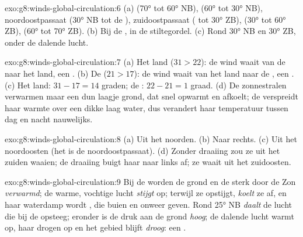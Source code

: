 \begin{solution}{exo:g8:winds-global-circulation:6}
(a)  (\ang{70} tot \ang{60} NB),  (\ang{60}
tot \ang{30} NB), noordoostpassaat (\ang{30} NB tot de ),
zuidoostpassaat ( tot \ang{30} ZB),  (\ang{30} tot
\ang{60} ZB),  (\ang{60} tot \ang{70} ZB). (b) Bij de
, in de stiltegordel. (c) Rond \ang{30} NB en \ang{30} ZB, onder de
dalende lucht.
\end{solution}

\begin{solution}{exo:g8:winds-global-circulation:7}
(a) Het land ($31 > 22$): de wind waait van de  naar het land, een
. (b) De  ($21 > 17$): de wind waait van het land naar de
, een . (c) Het land: $31 - 17 = 14$ graden; de : $22 -
21 = 1$ graad. (d) De zonnestralen verwarmen maar een dun laagje grond, dat
snel opwarmt en afkoelt; de  verspreidt haar warmte over een dikke laag
water, dus verandert haar temperatuur tussen dag en nacht nauwelijks.
\end{solution}

\begin{solution}{exo:g8:winds-global-circulation:8}
(a) Uit het noorden. (b) Naar rechts. (c) Uit het noordoosten (het is de
noordoostpassaat). (d) Zonder draaiing zou ze uit het zuiden waaien; de
draaiing buigt haar naar links af; ze waait uit het zuidoosten.
\end{solution}

\begin{solution}{exo:g8:winds-global-circulation:9}
Bij de  worden de grond en de  sterk door de Zon \emph{verwarmd};
de warme, vochtige lucht \emph{stijgt} op; terwijl ze opstijgt,
\emph{koelt} ze af, en haar waterdamp wordt \emph{}, die buien
en onweer geven. Rond \ang{25} NB \emph{daalt} de lucht die bij de 
opsteeg; eronder is de druk aan de grond \emph{hoog}; de dalende lucht
warmt op, haar  drogen op en het gebied blijft \emph{droog}: een
.
\end{solution}

